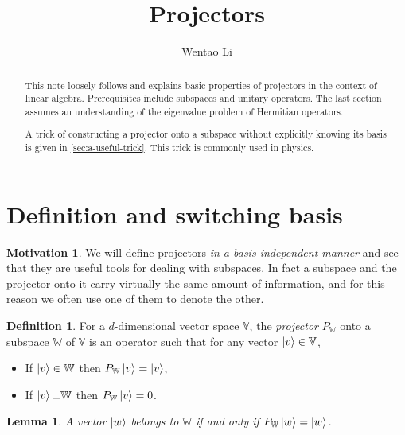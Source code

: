 \documentclass{article}
\author{Wentao Li}
\theoremstyle{definition}
\newtheorem{mot}{Motivation}[section]
\newtheorem{dfn}{Definition}[section]
\theoremstyle{plain}
\newtheorem{lem}{Lemma}[section]
\numberwithin{equation}{section}
\begin{document}
    
\title{Projectors}

\maketitle

\begin{abstract}
    This note 
    loosely follows 
    \cite{nielsen_quantum_2010} and 
    explains basic properties of projectors 
    in the context of linear algebra. 
    Prerequisites include 
    subspaces and unitary operators. 
    The last section assumes an understanding 
    of the eigenvalue problem of Hermitian operators.

    A trick of constructing a projector onto a subspace 
    without explicitly knowing its basis is given in \cref{sec:a-useful-trick}. 
    This trick is 
    commonly used in physics.
\end{abstract}

\tableofcontents

\section{Definition and switching basis}

\begin{mot}
    We will define projectors 
    \textit{in a basis-independent manner} 
    and see that they are useful tools 
    for dealing with subspaces. 
    In fact a subspace and the projector onto it 
    carry virtually the same amount of information, 
    and for this reason 
    we often use one of them to denote the other. 
\end{mot}

\begin{dfn}
    For a $d$-dimensional vector space $\mathbb{V}$, 
    the \textit{projector} 
    $P_{\mathbb{W}}$ onto a subspace 
    $\mathbb{W}$ of $\mathbb{V}$ is 
    an operator such that for any vector 
    $\ket{v}\in \mathbb{V}$, 

    \begin{itemize}
        \item 
        If $\ket{v}\in \mathbb{W}$ then 
        $P_{\mathbb{W}} \ket{v}=\ket{v}$,
        \item 
        If $\ket{v} \bot \mathbb{W}$ then 
        $P_{\mathbb{W}} \ket{v}=0$.
    \end{itemize}
    \label{dfn:projector}
\end{dfn}

\begin{lem}
\label{lem:equivalence-between-projector-and-subspace}
    A vector $\ket{w}$ belongs to $\mathbb{W}$ if and only if 
    $P_{\mathbb{W}} \ket{w} = \ket{w}$.
\end{lem}
\end{document}
